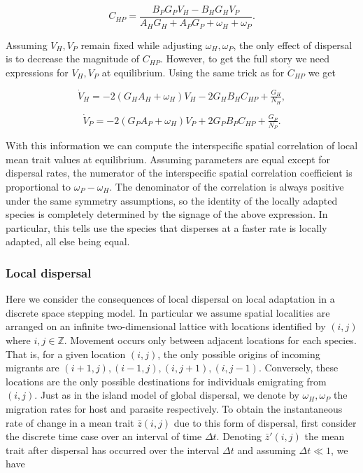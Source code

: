 \documentclass{article}
\begin{document}
\[C_{HP}=\frac{B_{P} G_{P} V_{H}-B_{H} G_{H} V_{P}}{A_{H} G_{H} + A_{P} G_{P} + \omega_{H} + \omega_{P}}.\]

Assuming \(V_H,V_P\) remain fixed while adjusting \(\omega_H,\omega_P\),
the only effect of dispersal is to decrease the magnitude of \(C_{HP}\).
However, to get the full story we need expressions for \(V_H,V_P\) at
equilibrium. Using the same trick as for \(\dot C_{HP}\) we get

\[\dot V_H=-2(G_HA_H+\omega_H)V_H-2G_HB_HC_{HP}+\tfrac{G_H}{N_H},\]

\[\dot V_P=-2(G_PA_P+\omega_H)V_P+2G_PB_PC_{HP}+\tfrac{G_P}{N_P}.\]

With this information we can compute the interspecific spatial
correlation of local mean trait values at equilibrium. Assuming
parameters are equal except for dispersal rates, the numerator of the
interspecific spatial correlation coefficient is proportional to
\(\omega_{P} - \omega_{H}\). The denominator of the correlation is
always positive under the same symmetry assumptions, so the identity of
the locally adapted species is completely determined by the signage of
the above expression. In particular, this tells use the species that
disperses at a faster rate is locally adapted, all else being equal.

\hypertarget{local-dispersal}{%
\subsubsection{Local dispersal}\label{local-dispersal}}

Here we consider the consequences of local dispersal on local adaptation
in a discrete space stepping model. In particular we assume spatial
localities are arranged on an infinite two-dimensional lattice with
locations identified by \((i,j)\) where \(i,j\in\mathbb Z\). Movement
occurs only between adjacent locations for each species. That is, for a
given location \((i,j)\), the only possible origins of incoming migrants
are \((i+1,j),(i-1,j),(i,j+1),(i,j-1)\). Conversely, these locations are
the only possible destinations for individuals emigrating from
\((i,j)\). Just as in the island model of global dispersal, we denote by
\(\omega_H,\omega_P\) the migration rates for host and parasite
respectively. To obtain the instantaneous rate of change in a mean trait
\(\bar z(i,j)\) due to this form of dispersal, first consider the
discrete time case over an interval of time \(\Delta t\). Denoting
\(\bar z'(i,j)\) the mean trait after dispersal has occurred over the
interval \(\Delta t\) and assuming \(\Delta t\ll1\), we have
\end{document}
